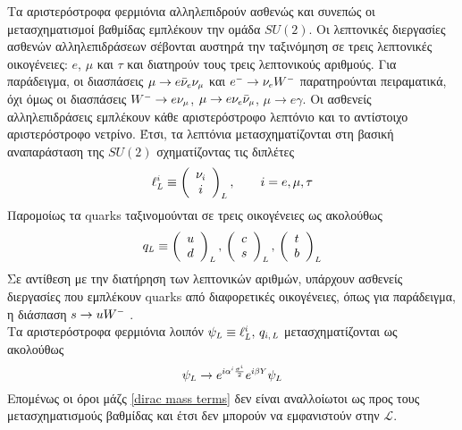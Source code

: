 Τα αριστερόστροφα φερμιόνια αλληλεπιδρούν ασθενώς %
και συνεπώς οι μετασχηματισμοί βαθμίδας εμπλέκουν την ομάδα $SU(2)$.
Οι λεπτονικές διεργασίες ασθενών αλληλεπιδράσεων σέβονται αυστηρά την ταξινόμηση σε τρεις λεπτονικές οικογένειες: $e$, $\mu$ και $\tau$ και διατηρούν τους τρεις 
λεπτονικούς αριθμούς.
Για παράδειγμα, οι διασπάσεις $\mu\rightarrow e\Bar{\nu}\subscr{e}\nu\subscr{\mu}$ και $e\superscr{-}\rightarrow\nu\subscr{e}W\superscr{-}$ παρατηρούνται πειραματικά, όχι όμως οι διασπάσεις $W\superscr{-}\rightarrow e\nu\subscr{\mu}$, $\mu\rightarrow e\nu\subscr{e}\Bar{\nu}\subscr{\mu}$, $\mu\rightarrow e\gamma$. Οι ασθενείς αλληλεπιδράσεις 
εμπλέκουν κάθε αριστερόστροφο λεπτόνιο και το αντίστοιχο αριστερόστροφο νετρίνο. 
Έτσι, τα λεπτόνια μετασχηματίζονται στη βασική αναπαράσταση της $SU(2)$ σχηματίζοντας τις διπλέτες
\begin{equation}
    \ell\subscr{L}\superscr{i}\equiv\left(\begin{array}{c} \nu\subscr{i} \\ i \end{array}\right)\subscr{L},\qquad i=e,\mu,\tau
\end{equation}
Παρομοίως τα quarks ταξινομούνται σε τρεις οικογένειες ως ακολούθως
\begin{equation}
    q\subscr{L}\equiv \left(\begin{array}{c} u \\ d \end{array}\right)\subscr{L},\,\left(\begin{array}{c} c \\ s \end{array}\right)\subscr{L},\,\left(\begin{array}{c} t \\ b \end{array}\right)\subscr{L} 
\end{equation}
Σε αντίθεση με την διατήρηση των λεπτονικών αριθμών, 
υπάρχουν ασθενείς διεργασίες 
που εμπλέκουν quarks από διαφορετικές οικογένειες, όπως για παράδειγμα, η διάσπαση $s\rightarrow uW\superscr{-}$ \cite{Griffiths:111880}. \\

Τα αριστερόστροφα φερμιόνια λοιπόν $\psi\subscr{L}\equiv\ell\superscr{i}\subscr{L},\,q\subscr{i,L}$ μετασχηματίζονται ως ακολούθως
\begin{equation}
    \psi\subscr{L}\rightarrow e\superscr{i\alpha\superscr{i}\frac{\sigma\superscr{i}}{2}}e\superscr{i\beta Y}\psi\subscr{L}
\end{equation}
Επομένως οι όροι μάζς \eqref{dirac mass terms}
δεν είναι αναλλοίωτοι ως προς τους μετασχηματισμούς βαθμίδας και έτσι δεν μπορούν να εμφανιστούν στην $\mathcal{L}$. \\

